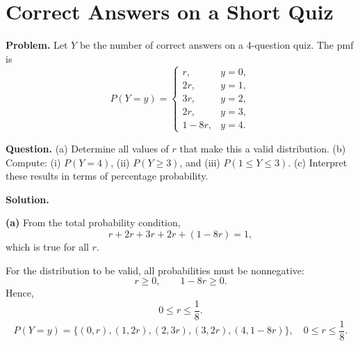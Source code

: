 		
		\section{Correct Answers on a Short Quiz}
		
		\textbf{Problem.}
		Let $Y$ be the number of correct answers on a 4-question quiz. The pmf is
		\[
		P(Y=y)=\begin{cases}
			r, & y=0,\\
			2r, & y=1,\\
			3r, & y=2,\\
			2r, & y=3,\\
			1-8r, & y=4.
		\end{cases}
		\]
		
		\textbf{Question.}
		(a) Determine all values of $r$ that make this a valid distribution.
		(b) Compute: (i) $P(Y=4)$, (ii) $P(Y\ge 3)$, and (iii) $P(1\le Y\le 3)$.
		(c) Interpret these results in terms of percentage probability.
		
		\textbf{Solution.}

		\textbf{(a)} From the total probability condition,
		\[
		r+2r+3r+2r+(1-8r)=1,
		\]
		which is true for all $r$.
		
		For the distribution to be valid, all probabilities must be nonnegative:
		\[
		r\ge 0,\qquad 1-8r\ge 0.
		\]
		Hence,
		\[
		0\le r\le \frac{1}{8}.
		\]
		\[
		P(Y=y)=\{(0,r),(1,2r),(2,3r),(3,2r),(4,1-8r)\},\quad 0\le r\le\frac18.
		\]
		\begin{center}
		\hspace{0.35cm}
		\end{center}
		

